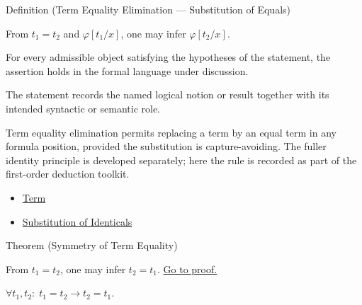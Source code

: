 \begin{definitionbox}{Definition (Term Equality Elimination --- Substitution of Equals)}
\begin{definition}\label{def:eq-elim}
From $t_1 = t_2$ and $\varphi[t_1/x]$, one may infer $\varphi[t_2/x]$.
\end{definition}
\end{definitionbox}
\begin{remark*}
For every admissible object satisfying the hypotheses of the statement, the
assertion holds in the formal language under discussion.
\end{remark*}

\begin{remark*}[Interpretation]
The statement records the named logical notion or result together with its
intended syntactic or semantic role.
\end{remark*}


\begin{remark*}[Exposition]
Term equality elimination permits replacing a term by an equal term in any
formula position, provided the substitution is capture-avoiding. The fuller
identity principle is developed separately; here the rule is recorded as part
of the first-order deduction toolkit.
\end{remark*}


\begin{dependencies}
\begin{itemize}
  \item \hyperref[def:term]{Term}
  \item \hyperref[ax:axiomatic-equality-substitution]{Substitution of Identicals}
\end{itemize}
\end{dependencies}

\begin{theorembox}{Theorem (Symmetry of Term Equality)}
\begin{theorem}\label{thm:eq-sym}
From $t_1 = t_2$, one may infer $t_2 = t_1$.
\hyperref[prf:eq-sym]{Go to proof.}
\end{theorem}
\end{theorembox}
\begin{remark*}
$\forall t_1, t_2:\; t_1=t_2 \to t_2=t_1$.
\end{remark*}

